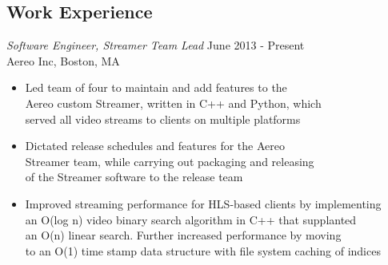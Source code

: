 \documentclass[line,margin]{res}
\begin{document}
\begin{resume}
        \section{Work Experience}
            {\sl Software Engineer, Streamer Team Lead} \hfill June 2013 - Present \\ %
            Aereo Inc, Boston, MA
                \begin{itemize} \itemsep -2pt %
                    \item Led team of four to maintain and add features to the \\
                          Aereo custom Streamer, written in C++ and Python, which \\
                          served all video streams to clients on multiple platforms
                    \item Dictated release schedules and features for the Aereo \\
                          Streamer team, while carrying out packaging and releasing \\
                          of the Streamer software to the release team
                    \item Improved streaming performance for HLS-based clients by implementing \\
                          an O(log n) video binary search algorithm in C++ that supplanted \\
                          an O(n) linear search. Further increased performance by moving \\
                          to an O(1) time stamp data structure with file system caching of indices
                \end{itemize}



\end{resume}
\end{document}
